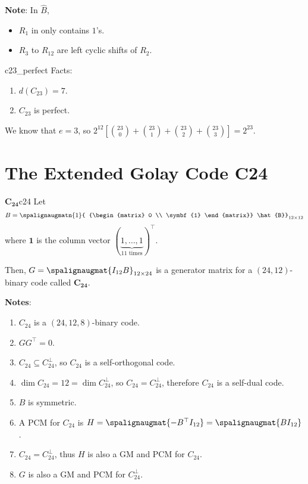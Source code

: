 \textbf{Note}: In $ \hat{B} $,
\begin{itemize}
    \item $ R_1 $ in only contains $ 1 $'s.
    \item $ R_3 $ to $ R_{12} $ are left cyclic shifts of $ R_2 $.
\end{itemize}

\begin{Theorem}{}{c23_perfect}
    Facts:
    \begin{enumerate}
        \item $ d(C_{23})=7 $.
        \item $ C_{23} $ is perfect.
    \end{enumerate}
\end{Theorem}

\begin{Proof}{}{}
    We know that $ e=3 $, so
    $ 2^{12}\left[ \binom{23}{0}+\binom{23}{1}+\binom{23}{2}+\binom{23}{3} \right]=
        2^{23} $.
\end{Proof}

\section{The Extended Golay Code C24}
\begin{Definition}{$ \symbf{C_{24}} $}{c24}
    Let
    \[ B=\spalignaugmatn{1}{
            {\begin{matrix}
                        0 \\
                        \symbf{1}
                    \end{matrix}}
            \hat{B}}_{12\times{} 12}
    \]
    where $ \symbf{1} $ is the column vector $ (\underbrace{1,\ldots ,1}_{11\text{ times}})^\top $.

    Then, $ G=\spalignaugmat{I_{12} B}_{12\times 24} $ is a generator
    matrix for a $ (24,12) $-binary code called $ \symbf{C_{24}} $.
\end{Definition}

\textbf{Notes}:
\begin{enumerate}[label=(\arabic*)]
    \item $ C_{24} $ is a $ (24,12,8) $-binary code.
    \item $ GG^\top=0 $.
    \item $ C_{24}\subseteq C_{24}^\perp $,
          so $ C_{24} $ is a self-orthogonal code.
    \item $ \dim{C_{24}}=12=\dim{C_{24}^\perp} $, so
          $ C_{24}=C_{24}^\perp $, therefore $ C_{24} $ is a self-dual code.
    \item $ B $ is symmetric.
    \item A PCM for $ C_{24} $ is $ H=\spalignaugmat{{-B^\top} I_{12}}=
              \spalignaugmat{B I_{12}} $.
    \item $ C_{24}=C_{24}^\perp $, thus $ H $ is also a GM and PCM for $ C_{24} $.
    \item $ G $ is also a GM and PCM for $ C_{24}^\perp $.
\end{enumerate}

